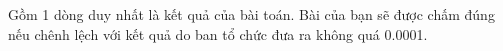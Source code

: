 Gồm 1 dòng duy nhất là kết quả của bài toán. Bài của bạn sẽ được chấm đúng nếu chênh lệch với kết quả do ban tổ chức đưa ra không quá 0.0001.